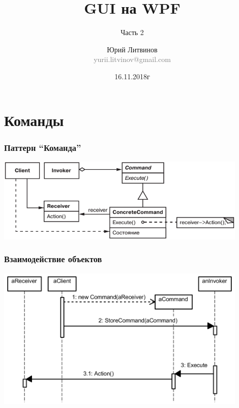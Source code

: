 \documentclass[xetex,mathserif,serif]{beamer}
\title{GUI на WPF}
\subtitle{Часть 2}
\author[Юрий Литвинов]{Юрий Литвинов\\\small{\textcolor{gray}{yurii.litvinov@gmail.com}}}
\date{16.11.2018г}
\begin{document}
	\frame{\titlepage}

	\section{Команды}

	\begin{frame}
		\frametitle{Паттерн ``Команда''}
		\begin{center}
			\includegraphics[width=0.9\textwidth]{command.png}
		\end{center}
	\end{frame}

	\begin{frame}
		\frametitle{Взаимодействие объектов}
		\begin{center}
			\includegraphics[width=0.9\textwidth]{commandSequence.png}
		\end{center}
	\end{frame}
\end{document}
